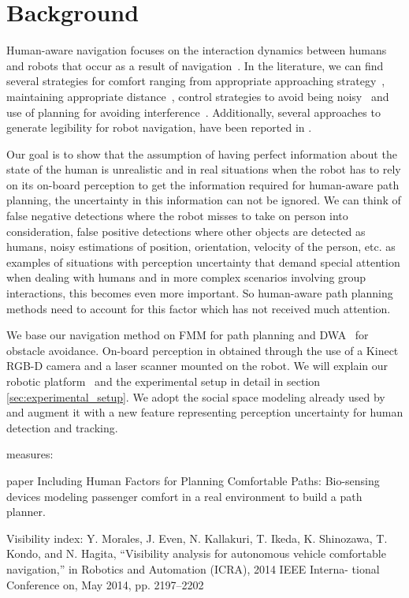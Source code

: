 \section{Background}
\label{sec:background}
Human-aware navigation focuses on the interaction dynamics between humans and robots that occur as a result of navigation~\cite{Kruse2013}. In the literature, we can find several strategies for comfort ranging from appropriate approaching strategy~\cite{Dautenhahn2006}, maintaining appropriate distance~\cite{Takayama2009}, control strategies to avoid being noisy~\cite{Martinson2007} and use of planning for avoiding interference~\cite{Vasquez2012}. Additionally, several approaches to generate legibility for robot navigation, have been reported in \cite{lichtenthaler2013towards}.

Our goal is to show that the assumption of having perfect information about the state of the human is unrealistic and in real situations when the robot has to rely on its on-board perception to get the information required for human-aware path planning, the uncertainty in this information can not be ignored. We can think of false negative detections where the robot misses to take on person into consideration, false positive detections where other objects are detected as humans, noisy estimations of position, orientation, velocity of the person, etc. as examples of situations with perception uncertainty that demand special attention when dealing with humans and in more complex scenarios involving group interactions, this becomes even more important. So human-aware path planning methods need to account for this factor which has not received much attention.

We base our navigation method on FMM \cite{ventura2015} for path planning and DWA~\cite{fox1997dynamic} for obstacle avoidance. On-board perception in obtained through the use of a Kinect RGB-D camera and a laser scanner mounted on the robot. We will explain our robotic platform~\cite{Messias2014robotic} and the experimental setup in detail in section \ref{sec:experimental_setup}. We adopt the social space modeling already used by \cite{kirby2009companion,gomez2014fast} and augment it with a new feature representing perception uncertainty for human detection and tracking.


measures:

paper Including Human Factors for Planning Comfortable Paths:
Bio-sensing devices 
modeling passenger comfort in a real environment to build a path planner.



Visibility index:
Y. Morales, J. Even, N. Kallakuri, T. Ikeda, K. Shinozawa, T. Kondo, and N. Hagita, “Visibility analysis for autonomous vehicle comfortable navigation,” in Robotics and Automation (ICRA), 2014 IEEE Interna- tional Conference on, May 2014, pp. 2197–2202